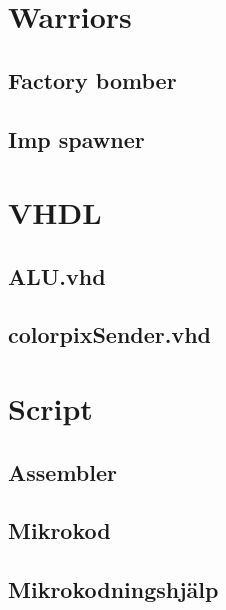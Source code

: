 \documentclass[11pt]{article}
\begin{document}
\newpage

\appendix
\section{Warriors}

\subsection{Factory bomber}


\subsection{Imp spawner}




\newpage
\section{VHDL}

\subsection{ALU.vhd}


\newpage
\subsection{colorpixSender.vhd}





\newpage
\section{Script}

\subsection{Assembler}


\newpage
\subsection{Mikrokod}


\newpage
\subsection{Mikrokodningshjälp}

\end{document}
